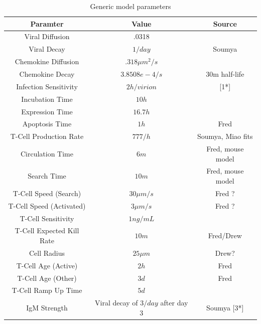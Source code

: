 \documentclass[10pt]{article}
\begin{document}
\begin{table}
\begin{tabular}{ | c | c | c | }
  \hline                        
  Paramter & Value & Source \\
  \hline
  Viral Diffusion & .0318 & \cite{Beauchemin2006} \\
  Viral Decay &  $1/day$ & Soumya \\
  Chemokine Diffusion & $.318 \mu m^2/s$ & \cite{Beauchemin2006} \\
  Chemokine Decay &  $3.8508e-4/s$ & 30m half-life \\
  Infection Sensitivity &  $2 h/virion$ & [1*] \\
  Incubation Time &  $10 h$ & \cite{Mitchell2011} \\
  Expression Time &  $16.7 h$ & \cite{Mitchell2011} \\
  Apoptosis Time & $1 h$ & Fred \\
  T-Cell Production Rate & $777/h$ & Soumya, Miao fits \\ 
  Circulation Time & $6 m$ & Fred, mouse model \\
  Search Time & $10 m$ & Fred, mouse model \\
  T-Cell Speed (Search) & $30 \mu m/s$ & Fred ? \\
  T-Cell Speed (Activated) & $3 \mu m/s$ & Fred ?\\
  T-Cell Sensitivity & $1 ng/mL$ & \cite{Gao2003} \\
  T-Cell Expected Kill Rate & $10 m$ & Fred/Drew \\
  Cell Radius & $25 \mu m$ & Drew? \\
  T-Cell Age (Active) & $2 h$ & Fred \\
  T-Cell Age (Other) & $3 d$ & Fred \\
  T-Cell Ramp Up Time & $5 d$ & \cite{Banerjee2011} \\
  IgM Strength & Viral decay of $3/day$ after day 3 & Soumya [3*] \\
  \hline  
\end{tabular}
\caption{Generic model parameters}
\label{table:parameters}
\end{table}
\end{document}
